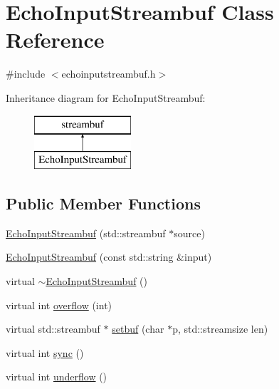 \hypertarget{classstanfordcpplib_1_1EchoInputStreambuf}{}\section{Echo\+Input\+Streambuf Class Reference}
\label{classstanfordcpplib_1_1EchoInputStreambuf}


{\ttfamily \#include $<$echoinputstreambuf.\+h$>$}

Inheritance diagram for Echo\+Input\+Streambuf\+:\begin{figure}[H]
\begin{center}
\leavevmode
\includegraphics[height=2.000000cm]{classstanfordcpplib_1_1EchoInputStreambuf}
\end{center}
\end{figure}
\subsection*{Public Member Functions}
\begin{DoxyCompactItemize}
\item 
\mbox{\hyperlink{classstanfordcpplib_1_1EchoInputStreambuf_a708155d9f25b8e73432c541e5a7d0f07}{Echo\+Input\+Streambuf}} (std\+::streambuf $\ast$source)
\item 
\mbox{\hyperlink{classstanfordcpplib_1_1EchoInputStreambuf_abf31cdf423a80fa9a3b5c65dd20378fd}{Echo\+Input\+Streambuf}} (const std\+::string \&input)
\item 
virtual \mbox{\hyperlink{classstanfordcpplib_1_1EchoInputStreambuf_abbb0d282d20bed4b6b5d8c700c312344}{$\sim$\+Echo\+Input\+Streambuf}} ()
\item 
virtual int \mbox{\hyperlink{classstanfordcpplib_1_1EchoInputStreambuf_a71cbc6b1ec560d3788dac4c02e9328da}{overflow}} (int)
\item 
virtual std\+::streambuf $\ast$ \mbox{\hyperlink{classstanfordcpplib_1_1EchoInputStreambuf_adab87f356f20a3d6ac970facd081f967}{setbuf}} (char $\ast$p, std\+::streamsize len)
\item 
virtual int \mbox{\hyperlink{classstanfordcpplib_1_1EchoInputStreambuf_a810a727ce5554d3178e17b6bc55025dd}{sync}} ()
\item 
virtual int \mbox{\hyperlink{classstanfordcpplib_1_1EchoInputStreambuf_aeb6918bd44153b257e097e2d2ef370ef}{underflow}} ()
\end{DoxyCompactItemize}


